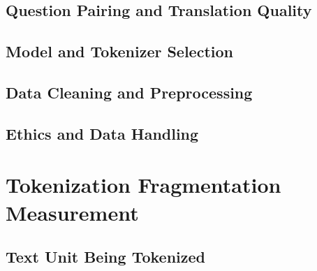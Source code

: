 \documentclass[runningheads]{llncs}
\begin{document}
\subsection{Question Pairing and Translation Quality}

\subsection{Model and Tokenizer Selection}

\subsection{Data Cleaning and Preprocessing}


\subsection{Ethics and Data Handling}

\section{Tokenization Fragmentation Measurement}
\subsection{Text Unit Being Tokenized}
\end{document}
